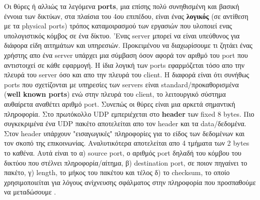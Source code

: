 \documentclass[hidelinks, 12pt, a4paper]{article}
\begin{document}
Οι θύρες ή αλλιώς τα λεγόμενα \textbf{ports}, μια επίσης πολύ συνηθισμένη και βασική έννοια των δικτύων, στα πλαίσια του 4ου επιπέδου, είναι ένας \textbf{λογικός} (σε αντίθεση με τα physical ports) τρόπος καταμοιρασμού των εργασιών που υλοποιεί ενας υπολογιστικός κόμβος σε ένα δίκτυο. 'Ενας server μπορεί να είναι υπεύθυνος για διάφορα είδη αιτημάτων και υπηρεσιών. Προκειμένου να διαχωρίσουμε τι ζητάει ένας χρήστης απο ένα server υπάρχει μια σύμβαση όσον αφορά τον αριθμό του port που αντιστοιχεί σε κάθε εφαρμογή. Η ίδια λογική των ports εφαρμόζεται τόσο απο την πλευρά του server όσο και απο την πλευρά του client. Η διαφορά είναι ότι συνήθως ports που σχετίζονται με υπηρεσίες των servers είναι standard/προκαθορισμένα (\textbf{well known ports}) ενώ στην πλευρά του client, το λειτουργικό σύστημα αυθαίρετα αναθέτει αριθμό port. Συνεπώς οι θύρες είναι μια αρκετά σημαντική πληροφορία. Στο πρωτόκολλο UDP εμπεριέχεται στο \textbf{header} των fixed 8 bytes. Πιο συγκεκριμένα ένα UDP πακέτο αποτελείται απο τον header και τα data/δεδομένα. Στον header υπάρχουν "εισαγωγικές" πληροφορίες για το είδος των δεδομένων και τον σκοπό της επικοινωνίας. Αναλυτικότερα αποτελείται απο 4 τμήματα των 2 bytes το καθένα. Αυτά είναι το α) source port, ο αριθμός port δηλαδή του κόμβου του δικτύου που στέλνει πληροφορία/αίτημα, β) destination port, σε ποιον πηγαίνει το πακέτο, γ) length, το μήκος του πακέτου και τέλος δ) το checksum, το οποίο χρησιμοποιείται για λόγους ανίχνευσης σφάλματος στην πληροφορία που προσπαθούμε να μεταδώσουμε \cite{wiki_udp, gfgudp}.
\end{document}
